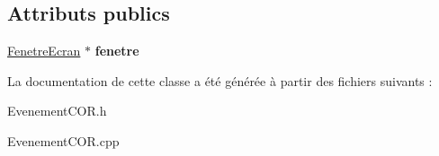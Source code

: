 \subsection*{Attributs publics}
\begin{DoxyCompactItemize}
\item 
\mbox{\label{class_evenement_c_o_r_a45e506681a748d17833a9a0453aa0660}} 
\mbox{\hyperlink{class_fenetre_ecran}{Fenetre\+Ecran}} $\ast$ {\bfseries fenetre}
\end{DoxyCompactItemize}


La documentation de cette classe a été générée à partir des fichiers suivants \+:\begin{DoxyCompactItemize}
\item 
Evenement\+C\+O\+R.\+h\item 
Evenement\+C\+O\+R.\+cpp\end{DoxyCompactItemize}

